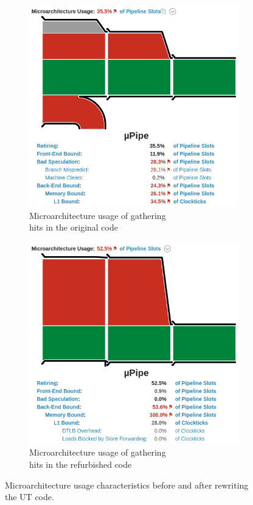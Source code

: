 \documentclass[12pt]{article}
\begin{document}
\begin{figure}[H]
	\centering
	\begin{subfigure}{.5\textwidth}
		\centering
		\includegraphics[width=\linewidth]{velout_gatherhits_orig_uarch}
		\caption{Microarchitecture usage of gathering\\ hits in the original code}
		\label{fig_velout_branch_example_sub1}
	\end{subfigure}%
	\begin{subfigure}{.5\textwidth}
		\centering
		\includegraphics[width=\linewidth]{velout_gatherhits_new_uarch}
		\caption{Microarchitecture usage of gathering\\ hits in the refurbished code}
		\label{fig_velout_branch_example_sub2}
	\end{subfigure}
	\caption{Microarchitecture usage characteristics before and after rewriting the UT code.}
	\label{fig_velout_branch_example}
\end{figure}
\end{document}
